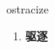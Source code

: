 
\begin{frame}
{\huge ostracize}
\begin{center}
\begin{enumerate}\Large
  \item \textbf{驱逐}
\end{enumerate}
\end{center}
\end{frame}
